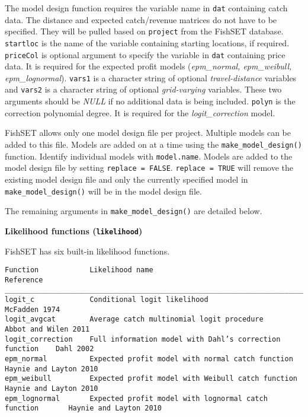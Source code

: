 \documentclass[
]{article}
\begin{document}
The model design function requires the variable name in \texttt{dat} containing catch data. The distance and expected catch/revenue matrices do not have to be specified. They will be pulled based on \texttt{project} from the FishSET database. \texttt{startloc} is the name of the variable containing starting locations, if required. \texttt{priceCol} is optional argument to specify the variable in \texttt{dat} containing price data. It is required for the expected profit models (\emph{epm\_normal, epm\_weibull, epm\_lognormal}). \texttt{vars1} is a character string of optional \emph{travel-distance} variables and \texttt{vars2} is a character string of optional \emph{grid-varying} variables. These two arguments should be \emph{NULL} if no additional data is being included. \texttt{polyn} is the correction polynomial degree. It is required for the \emph{logit\_correction} model.

FishSET allows only one model design file per project. Multiple models can be added to this file. Models are added on at a time using the \texttt{make\_model\_design()} function. Identify individual models with \texttt{model.name}. Models are added to the model design file by setting \texttt{replace\ =\ FALSE}. \texttt{replace\ =\ TRUE} will remove the existing model design file and only the currently specified model in \texttt{make\_model\_design()} will be in the model design file.

The remaining arguments in \texttt{make\_model\_design()} are detailed below.

\textbf{Likelihood functions (\texttt{likelihood})}

FishSET has six built-in likelihood functions.

\begin{verbatim}
Function            Likelihood name                                         Reference
________________________________________________________________________________________________
logit_c             Conditional logit likelihood                              McFadden 1974
logit_avgcat        Average catch multinomial logit procedure                 Abbot and Wilen 2011
logit_correction    Full information model with Dahl’s correction function    Dahl 2002 
epm_normal          Expected profit model with normal catch function          Haynie and Layton 2010
epm_weibull         Expected profit model with Weibull catch function         Haynie and Layton 2010
epm_lognormal       Expected profit model with lognormal catch function       Haynie and Layton 2010
\end{verbatim}
\end{document}
